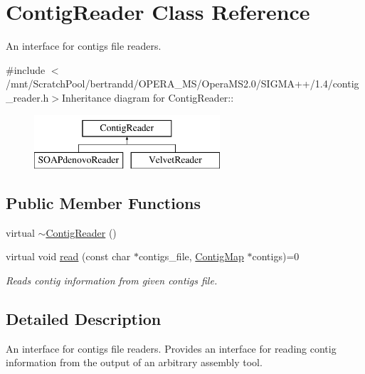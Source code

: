 \hypertarget{classContigReader}{
\section{ContigReader Class Reference}
\label{classContigReader}
}


An interface for contigs file readers.  


{\ttfamily \#include $<$/mnt/ScratchPool/bertrandd/OPERA\_\-MS/OperaMS2.0/SIGMA++/1.4/contig\_\-reader.h$>$}Inheritance diagram for ContigReader::\begin{figure}[H]
\begin{center}
\leavevmode
\includegraphics[height=2cm]{classContigReader}
\end{center}
\end{figure}
\subsection*{Public Member Functions}
\begin{DoxyCompactItemize}
\item 
virtual \hyperlink{classContigReader_a26db06ba9c6316bfee92a5f5b19cf3d4}{$\sim$ContigReader} ()
\item 
virtual void \hyperlink{classContigReader_a935b5918388b7009b36e639391cfa4e8}{read} (const char $\ast$contigs\_\-file, \hyperlink{contig_8h_aa2acb8d3b78def617ec4509a1f684c4e}{ContigMap} $\ast$contigs)=0
\begin{DoxyCompactList}\small\item\em Reads contig information from given contigs file. \item\end{DoxyCompactList}\end{DoxyCompactItemize}


\subsection{Detailed Description}
An interface for contigs file readers. Provides an interface for reading contig information from the output of an arbitrary assembly tool. 

